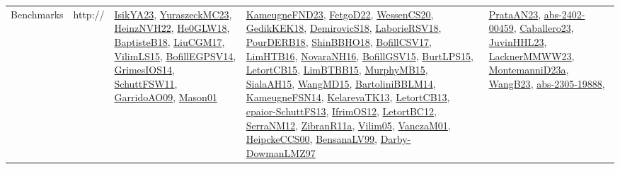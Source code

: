 {\begin{longtable}{lp{3cm}>{\raggedright}p{6cm}>{\raggedright}p{6cm}p{8cm}}
Benchmarks & http:// & \href{articles/IsikYA23.pdf}{IsikYA23}\cite{IsikYA23}, \href{papers/YuraszeckMC23.pdf}{YuraszeckMC23}\cite{YuraszeckMC23}, \href{articles/HeinzNVH22.pdf}{HeinzNVH22}\cite{HeinzNVH22}, \href{papers/He0GLW18.pdf}{He0GLW18}\cite{He0GLW18}, \href{articles/BaptisteB18.pdf}{BaptisteB18}\cite{BaptisteB18}, \href{papers/LiuCGM17.pdf}{LiuCGM17}\cite{LiuCGM17}, \href{papers/VilimLS15.pdf}{VilimLS15}\cite{VilimLS15}, \href{papers/BofillEGPSV14.pdf}{BofillEGPSV14}\cite{BofillEGPSV14}, \href{articles/GrimesIOS14.pdf}{GrimesIOS14}\cite{GrimesIOS14}, \href{articles/SchuttFSW11.pdf}{SchuttFSW11}\cite{SchuttFSW11}, \href{articles/GarridoAO09.pdf}{GarridoAO09}\cite{GarridoAO09}, \href{articles/Mason01.pdf}{Mason01}\cite{Mason01} & \href{papers/KameugneFND23.pdf}{KameugneFND23}\cite{KameugneFND23}, \href{articles/FetgoD22.pdf}{FetgoD22}\cite{FetgoD22}, \href{papers/WessenCS20.pdf}{WessenCS20}\cite{WessenCS20}, \href{articles/GedikKEK18.pdf}{GedikKEK18}\cite{GedikKEK18}, \href{papers/DemirovicS18.pdf}{DemirovicS18}\cite{DemirovicS18}, \href{articles/LaborieRSV18.pdf}{LaborieRSV18}\cite{LaborieRSV18}, \href{articles/PourDERB18.pdf}{PourDERB18}\cite{PourDERB18}, \href{articles/ShinBBHO18.pdf}{ShinBBHO18}\cite{ShinBBHO18}, \href{papers/BofillCSV17.pdf}{BofillCSV17}\cite{BofillCSV17}, \href{papers/LimHTB16.pdf}{LimHTB16}\cite{LimHTB16}, \href{articles/NovaraNH16.pdf}{NovaraNH16}\cite{NovaraNH16}, \href{papers/BofillGSV15.pdf}{BofillGSV15}\cite{BofillGSV15}, \href{papers/BurtLPS15.pdf}{BurtLPS15}\cite{BurtLPS15}, \href{articles/LetortCB15.pdf}{LetortCB15}\cite{LetortCB15}, \href{papers/LimBTBB15.pdf}{LimBTBB15}\cite{LimBTBB15}, \href{papers/MurphyMB15.pdf}{MurphyMB15}\cite{MurphyMB15}, \href{papers/SialaAH15.pdf}{SialaAH15}\cite{SialaAH15}, \href{articles/WangMD15.pdf}{WangMD15}\cite{WangMD15}, \href{papers/BartoliniBBLM14.pdf}{BartoliniBBLM14}\cite{BartoliniBBLM14}, \href{articles/KameugneFSN14.pdf}{KameugneFSN14}\cite{KameugneFSN14}, \href{papers/KelarevaTK13.pdf}{KelarevaTK13}\cite{KelarevaTK13}, \href{papers/LetortCB13.pdf}{LetortCB13}\cite{LetortCB13}, \href{papers/cpaior-SchuttFS13.pdf}{cpaior-SchuttFS13}\cite{cpaior-SchuttFS13}, \href{papers/IfrimOS12.pdf}{IfrimOS12}\cite{IfrimOS12}, \href{papers/LetortBC12.pdf}{LetortBC12}\cite{LetortBC12}, \href{papers/SerraNM12.pdf}{SerraNM12}\cite{SerraNM12}, \href{papers/ZibranR11a.pdf}{ZibranR11a}\cite{ZibranR11a}, \href{papers/Vilim05.pdf}{Vilim05}\cite{Vilim05}, \href{papers/VanczaM01.pdf}{VanczaM01}\cite{VanczaM01}, \href{articles/HeipckeCCS00.pdf}{HeipckeCCS00}\cite{HeipckeCCS00}, \href{articles/BensanaLV99.pdf}{BensanaLV99}\cite{BensanaLV99}, \href{articles/Darby-DowmanLMZ97.pdf}{Darby-DowmanLMZ97}\cite{Darby-DowmanLMZ97} & \href{articles/PrataAN23.pdf}{PrataAN23}\cite{PrataAN23}, \href{articles/abs-2402-00459.pdf}{abs-2402-00459}\cite{abs-2402-00459}, \href{articles/Caballero23.pdf}{Caballero23}\cite{Caballero23}, \href{papers/JuvinHHL23.pdf}{JuvinHHL23}\cite{JuvinHHL23}, \href{articles/LacknerMMWW23.pdf}{LacknerMMWW23}\cite{LacknerMMWW23}, \href{articles/MontemanniD23a.pdf}{MontemanniD23a}\cite{MontemanniD23a}, \href{papers/WangB23.pdf}{WangB23}\cite{WangB23}, \href{articles/abs-2305-19888.pdf}{abs-2305-19888}\cite{abs-2305-19888}, 
\end{longtable}}
